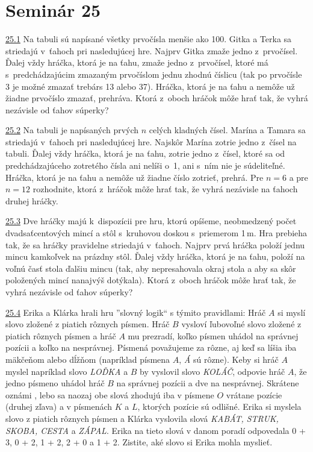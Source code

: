 \section*{Seminár 25}

\noindent \ul{25.1}  Na tabuli sú napísané všetky prvočísla menšie ako 100. Gitka a Terka sa striedajú v~ťahoch pri nasledujúcej hre. Najprv Gitka zmaže jedno z~prvočísel. Ďalej vždy hráčka, ktorá je na ťahu, zmaže jedno z~prvočísel, ktoré má s~predchádzajúcim zmazaným prvočíslom jednu zhodnú číslicu (tak po prvočísle 3 je možné zmazať trebárs 13 alebo 37). Hráčka, ktorá je na ťahu a nemôže už žiadne prvočíslo zmazať, prehráva. Ktorá z~oboch hráčok môže hrať tak, že vyhrá nezávisle od ťahov súperky?




\noindent \ul{25.2}  Na tabuli je napísaných prvých $n$ celých kladných čísel. Marína a Tamara sa striedajú v~ťahoch pri nasledujúcej hre. Najskôr Marína zotrie jedno z~čísel na tabuli. Ďalej vždy hráčka, ktorá je na ťahu, zotrie jedno z~čísel, ktoré sa od predchádzajúceho zotretého čísla ani nelíši o~1, ani s~ním nie je súdeliteľné. Hráčka, ktorá je na ťahu a nemôže už žiadne číslo zotrieť, prehrá. Pre $n = 6$ a pre $n = 12$ rozhodnite, ktorá z~hráčok môže hrať tak, že vyhrá nezávisle na ťahoch druhej hráčky.




\noindent \ul{25.3}  Dve hráčky majú k~dispozícii pre hru, ktorú opíšeme, neobmedzený počet dvadsaťcentových mincí a stôl s~kruhovou doskou s~priemerom 1\,m. Hra prebieha tak, že sa hráčky pravidelne striedajú v~ťahoch. Najprv prvá hráčka položí jednu mincu kamkoľvek na prázdny stôl. Ďalej vždy hráčka, ktorá je na ťahu, položí na voľnú časť stola ďalšiu mincu (tak, aby nepresahovala okraj stola a aby sa skôr položených mincí nanajvýš dotýkala). Ktorá z~oboch hráčok môže hrať tak, že vyhrá nezávisle od ťahov súperky?




\noindent \ul{25.4}  Erika a Klárka hrali hru ”slovný logik“ s týmito pravidlami: Hráč $A$ si myslí slovo zložené z piatich rôznych písmen. Hráč $B$ vysloví ľubovoľné slovo zložené z piatich rôznych písmen a hráč $A$ mu prezradí, koľko písmen uhádol na správnej pozícii a koľko na nesprávnej. Písmená považujeme za rôzne, aj keď sa líšia iba mäkčeňom alebo dĺžňom (napríklad písmena $A$, \textit{Á} sú rôzne). Keby si hráč $A$ myslel napríklad slovo \textit{LOĎKA} a $B$ by vyslovil slovo \textit{KOLÁČ}, odpovie hráč $A$, že jedno písmeno uhádol hráč $B$ na správnej pozícii a dve na nesprávnej. Skrátene oznámi , lebo sa naozaj obe slová zhodujú iba v písmene $O$ vrátane pozície (druhej zľava) a v písmenách $K$ a $L$, ktorých pozície sú odlišné. Erika si myslela slovo z piatich rôznych písmen a Klárka vyslovila slová \textit{KABÁT, STRUK, SKOBA, CESTA} a \textit{ZÁPAL}. Erika na tieto slová v danom poradí odpovedala 0 + 3, 0 + 2, 1 + 2, 2 + 0 a 1 + 2. Zistite, aké slovo si Erika mohla myslieť.




